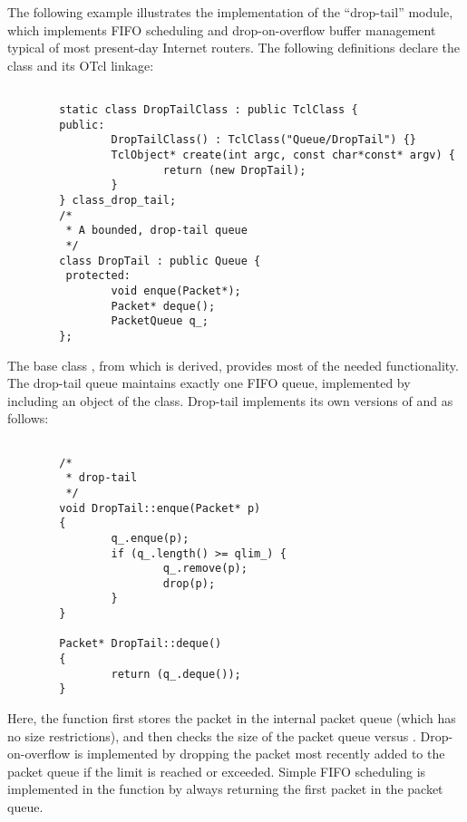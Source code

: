 The following example illustrates the implementation of the
``drop-tail'' module, which implements FIFO scheduling and
drop-on-overflow buffer management typical of most present-day
Internet routers.
The following definitions declare the class and its OTcl linkage:
\begin{small}
\begin{verbatim}

        static class DropTailClass : public TclClass {
        public:
                DropTailClass() : TclClass("Queue/DropTail") {}
                TclObject* create(int argc, const char*const* argv) {
                        return (new DropTail);
                }
        } class_drop_tail;
        /*
         * A bounded, drop-tail queue
         */
        class DropTail : public Queue {
         protected:
                void enque(Packet*);
                Packet* deque();
                PacketQueue q_;
        };

\end{verbatim}
\end{small}

The base class ,
from which  is derived, provides most
of the needed functionality.
The drop-tail queue maintains exactly one FIFO queue, implemented
by including an object of the  class.
Drop-tail implements its own versions of  and 
as follows:
\begin{small}
\begin{verbatim}

        /*
         * drop-tail
         */
        void DropTail::enque(Packet* p)
        {
                q_.enque(p);
                if (q_.length() >= qlim_) {
                        q_.remove(p);
                        drop(p);
                }
        }

        Packet* DropTail::deque()
        {
                return (q_.deque());
        }
\end{verbatim}
\end{small}
Here, the  function first stores the packet in the
internal packet queue (which has no size restrictions), and then
checks the size of the packet queue versus .
Drop-on-overflow is implemented by dropping the packet most recently
added to the packet queue if the limit is reached or exceeded.
Simple FIFO scheduling is implemented in the  function
by always returning the first packet in the packet queue.
